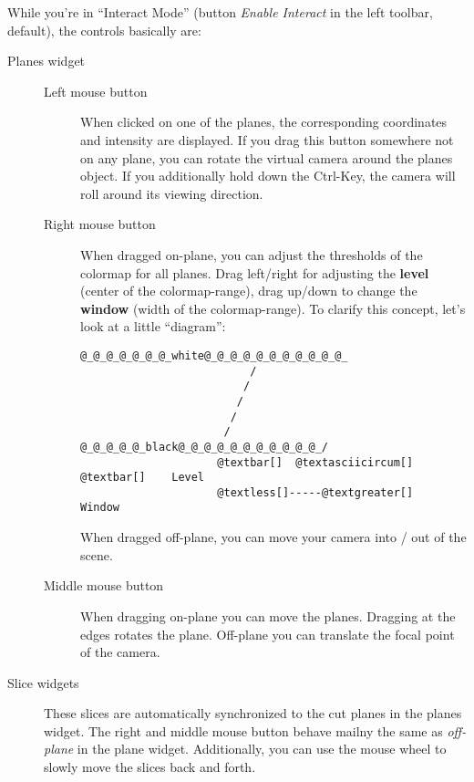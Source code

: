 \documentclass[letterpaper,10pt,english]{sphinxmanual}
\begin{document}
While you're in ``Interact Mode'' (button \emph{Enable Interact} in the left toolbar,
default), the controls basically are:
\begin{description}
\item[{Planes widget}] \leavevmode\begin{description}
\item[{Left mouse button}] \leavevmode
When clicked on one of the planes, the corresponding coordinates and intensity
are displayed. If you drag this button somewhere not on any plane, you can rotate
the virtual camera  around the planes object. If you additionally hold down the Ctrl-Key,
the camera will roll around its viewing direction.

\item[{Right mouse button}] \leavevmode
When dragged on-plane, you can adjust the thresholds of the colormap for all planes.
Drag left/right for adjusting the \textbf{level} (center of the colormap-range), drag
up/down to change the \textbf{window} (width of the colormap-range). To clarify this
concept, let's look at a little ``diagram'':

\begin{Verbatim}[commandchars=@\[\]]
                           @_@_@_@_@_@_@_white@_@_@_@_@_@_@_@_@_@_@_
                          /
                         /
                        /
                       /
                      /
@_@_@_@_@_black@_@_@_@_@_@_@_@_@_@_@_/
                     @textbar[]  @textasciicircum[]  @textbar[]    Level
                     @textless[]-----@textgreater[]    Window
\end{Verbatim}

When dragged off-plane, you can move your camera into / out of the scene.

\item[{Middle mouse button}] \leavevmode
When dragging on-plane you can move the planes. Dragging at the edges rotates the plane.
Off-plane you can translate the focal point of the camera.

\end{description}

\item[{Slice widgets}] \leavevmode
These slices are automatically synchronized to the cut planes in the planes widget.
The right and middle mouse button behave mailny the same as \emph{off-plane} in the plane
widget. Additionally, you can use the mouse wheel to slowly move the slices back and forth.

\end{description}
\end{document}
